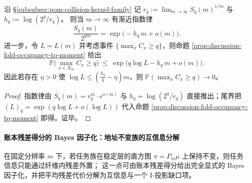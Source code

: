 \begin{corollary}[内禀 \(q\)-碰撞率的指数律与可存关系数门槛]\label{cor:discussion-fold-intrinsic-qcollision-threshold}
沿 \S\ref{subsubsec:pom-collision-kernel-family} 记
\(
r_q:=\lim_{m\to\infty}S_q(m)^{1/m}
\)
与
\(
h_q:=\log(2^q/r_q)
\)。
则当 \(m\to\infty\) 有渐近指数律
\[
\frac{S_q(m)}{2^{qm}}=\exp\bigl(-h_q\,m+o(m)\bigr).
\]
进一步，令 \(L=L(m)\) 并考虑事件 \(\{\max_x C_x\ge q\}\)，则命题 \ref{prop:discussion-fold-occupancy-tq-moment} 给出
\[
\mathbb{P}\Big(\max_{x\in X_m}C_x\ge q\Big)
\ \le\
\exp\Big(q\log L-h_q\,m+o(m)\Big).
\]
因此若存在 \(\eta>0\) 使 \(\log L\le (\frac{h_q}{q}-\eta)m\)，则 \(\mathbb{P}(\max_x C_x\ge q)\to 0\)。
\end{corollary}
\begin{proof}
指数律由 \(S_q(m)=r_q^m\cdot e^{o(m)}\) 与 \(h_q=\log(2^q/r_q)\) 直接推出；尾界把 \((L)_q=\exp(q\log L+o(\log L))\) 代入命题 \ref{prop:discussion-fold-occupancy-tq-moment} 即得。证毕。
\end{proof}

\paragraph{账本残差得分的 Bayes 因子化：地址不变族的互信息分解}
在固定分辨率 \(m\) 下，若任务族在稳定层的直方图 \(\pi=P_m\mu\) 上保持不变，则任务信息只能通过纤维内残差外置；
这一点可由账本残差得分给出完全显式的 Bayes 因子化，并把平均残差代价分解为互信息与一个 I-投影缺口项。

